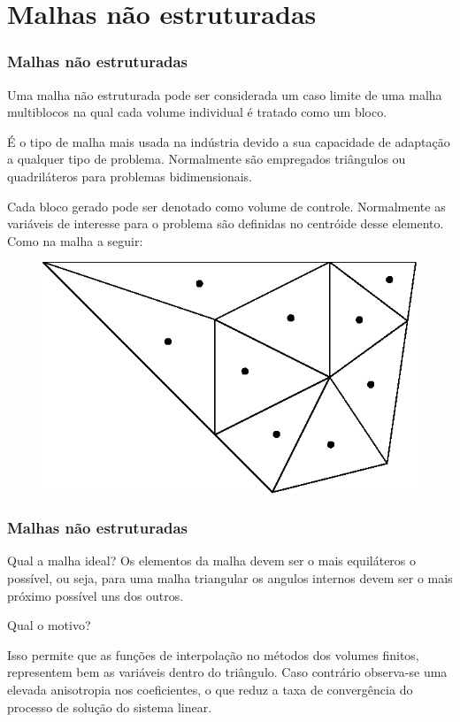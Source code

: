 \documentclass{beamer}
\begin{document}
\section{Malhas não estruturadas}
\begin{frame}
  \frametitle{Malhas não estruturadas}
  Uma malha não estruturada pode ser considerada um caso limite de uma malha multiblocos na qual cada volume individual é tratado como um bloco.

  É o tipo de malha mais usada na indústria devido a sua capacidade de adaptação a qualquer tipo de problema. Normalmente são empregados triângulos ou quadriláteros para problemas bidimensionais.

  Cada bloco gerado pode ser denotado como volume de controle. Normalmente as variáveis de interesse para o problema são definidas no centróide desse elemento. Como na malha a seguir:

  \begin{figure}
    \includegraphics[width=0.4\linewidth]{variacao_suave.eps}
  \end{figure}

\end{frame}

\begin{frame}
  \frametitle{Malhas não estruturadas}

  \begin{block}{Qual a malha ideal?}
    Os elementos da malha devem ser o mais equiláteros o possível, ou seja, para uma malha triangular os angulos internos devem ser o mais próximo possível uns dos outros.
  \end{block}

  \begin{block}{Qual o motivo?}

    Isso permite que as funções de interpolação no métodos dos volumes finitos, representem bem as variáveis dentro do triângulo. Caso contrário observa-se uma elevada anisotropia nos coeficientes, o que reduz a taxa de convergência do processo de solução do sistema linear.

  \end{block}

\end{frame}
\end{document}
